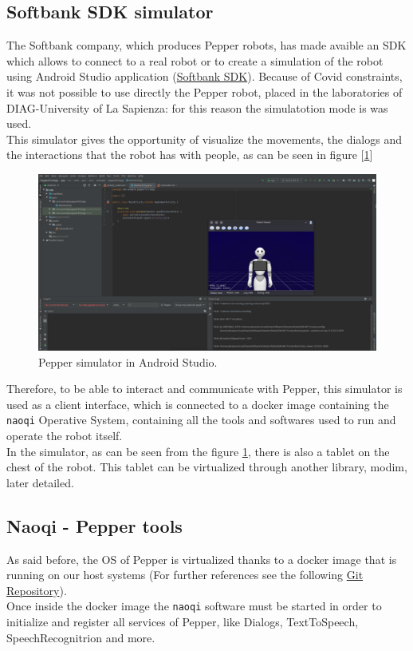 \documentclass[12pt, letterpaper, twoside]{article}
\begin{document}
\subsection{Softbank SDK simulator}
The Softbank company, which produces Pepper robots, has made avaible an SDK which allows to connect to a real robot or to create a simulation of the robot using Android Studio application (\href{https://qisdk.softbankrobotics.com/sdk/doc/pepper-sdk/index.html}{Softbank SDK}). Because of Covid constraints, it was not possible to use directly the Pepper robot, placed in the laboratories of DIAG-University of La Sapienza: for this reason the simulatotion mode is was used.\\

This simulator gives the opportunity of visualize the movements, the dialogs and the interactions that the robot has with people, as can be seen in figure [\ref{fig:android_sdk}]

\begin{figure}[htbp]
	\centerline{\includegraphics[scale=.3]{img/pepperSDK.png}}
	\caption{Pepper simulator in Android Studio.}
	\label{fig:android_sdk}
\end{figure}

Therefore, to be able to interact and communicate with Pepper, this simulator is used as a client interface, which is connected to a docker image containing the \verb|naoqi| Operative System, containing all the tools and softwares used to run and operate the robot itself.\\
In the simulator, as can be seen from the figure \ref{fig:android_sdk}, there is also a tablet on the chest of the robot. This tablet can be virtualized through another library, modim, later detailed.

\subsection{Naoqi - Pepper tools}
As said before, the OS of Pepper is virtualized thanks to a docker image that is running on our host systems (For further references see the following \href{https://bitbucket.org/iocchi/hri_software/src/master/}{Git Repository}).\\
Once inside the docker image the \verb|naoqi| software must be started in order to initialize and register all services of Pepper, like Dialogs, TextToSpeech, SpeechRecognitrion and more.\\
\end{document}
